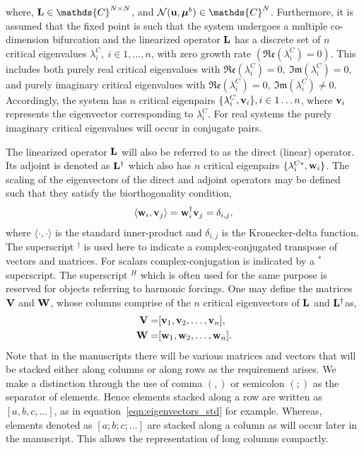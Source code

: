 where, $\Lu\in\mathds{C}^{N\times N}$, and $\mathcal{N}(\vecu,\vecMu)\in\mathds{C}^{N}$. Furthermore, it is assumed that the fixed point is such that the system undergoes a multiple co-dimension bifurcation and the linearized operator $\mathbf{L}$ has a discrete set of $n$ critical eigenvalues $\lambda^{C}_{i},\ i\in 1,\ldots,n$, with zero growth rate $(\mathfrak{Re}(\lambda^{C}_{i}) = 0)$. This includes both purely real critical eigenvalues with $\mathfrak{Re}(\lambda^{C}_{i}) = 0,\ \mathfrak{Im}(\lambda^{C}_{i}) = 0$, and purely imaginary critical eigenvalues with $\mathfrak{Re}(\lambda^{C}_{i}) = 0,\ \mathfrak{Im}(\lambda^{C}_{i}) \ne 0$. Accordingly, the system has $n$ critical eigenpairs $\{\lambda^{C}_{i},\mathbf{v}_{i}\}, i\in 1\ldots n$, where $\mathbf{v}_{i}$ represents the eigenvector corresponding to $\lambda^{C}_{i}$. For real systems the purely imaginary critical eigenvalues will occur in conjugate pairs. 

The linearized operator $\mathbf{L}$ will also be referred to as the direct (linear) operator. Its adjoint is denoted as $\mathbf{L}^{\dagger}$ which also has $n$ critical eigenpairs $\{\lambda^{C*}_{i}, \mathbf{w}_{i}\}$. The scaling of the eigenvectors of the direct and adjoint operators may be defined such that they satisfy the biorthogonality condition,
\begin{eqnarray}
	\langle\mathbf{w}_{i},\mathbf{v}_{j}\rangle = \mathbf{w}^{\dagger}_{i}\mathbf{v}_{j} = \delta_{i,j} \label{eqn:std_biorthogonality},
\end{eqnarray}
where $\langle\cdot,\cdot\rangle$ is the standard inner-product and $\delta_{i,j}$ is the Kronecker-delta function. The superscript $^{\dagger}$ is used here to indicate a complex-conjugated transpose of vectors and matrices. For scalars complex-conjugation is indicated by a $^{*}$ superscript. The superscript $^{H}$ which is often used for the same purpose is reserved for objects referring to harmonic forcings. One may define the matrices $\mathbf{V}$ and $\mathbf{W}$, whose columns comprise of the $n$ critical eigenvectors of $\mathbf{L}$ and $\mathbf{L}^{\dagger}$as,
\begin{subequations}
	\label{eqn:eigenvectors_std}
	\begin{align}
		\mathbf{V} =& [\mathbf{v}_{1},\mathbf{v}_{2},\ldots,\mathbf{v}_{n}], \\
		\mathbf{W} =& [\mathbf{w}_{1},\mathbf{w}_{2},\ldots,\mathbf{w}_{n}].
	\end{align}
\end{subequations}
Note that in the manuscripts there will be various matrices and vectors that will be stacked either along columns or along rows as the requirement arises. We make a distinction through the use of comma $(,)$ or semicolon $(;)$ as the separator of elements. Hence elements stacked along a row are written as $[a,b,c,\ldots]$, as in equation~\eqref{eqn:eigenvectors_std} for example. Whereas, elements denoted as $[a;b;c;\ldots]$ are stacked along a column as will occur later in the manuscript. This allows the representation of long columns compactly.  

